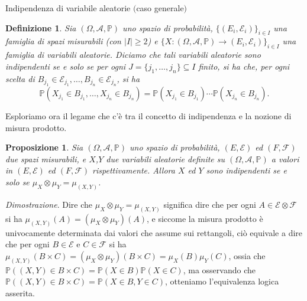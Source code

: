 \documentclass[11pt]{book}
\makeatletter
\theoremstyle{Definizione}
\newtheorem*{mydef}{Definizione}
\theoremstyle{TeoremaProposizioneLemmaCorollario}
\newtheorem{mypropo}[myteo]{Proposizione}
\theoremstyle{OsservazioneNota}
\renewenvironment{proof}[1][\proofname]{\par
  \normalfont \topsep6\p@\@plus6\p@\relax
  \trivlist
  \item[\hskip\labelsep
        \itshape
    #1\@addpunct{.}]\ignorespaces
}{%
  \endtrivlist\@endpefalse
}
\renewcommand{\P}{\mathbb{P}}
\renewenvironment{proof}{\textsl{Dimostrazione}.}{}
\makeatother
\begin{document}
\begin{boxdef}{Indipendenza di variabile aleatorie $($caso generale$)$}
\begin{mydef}
Sia $(\Omega,\mathcal{A},\P)$ uno spazio di probabilità, $\{(E_i,\mathcal{E}_i)\}_{i\in I}$ una famiglia di spazi misurabili (con $|I|\geq 2$) e $\{X:(\Omega,\mathcal{A},\P)\longrightarrow (E_i,\mathcal{E}_i)\}_{i\in I}$ una famiglia di variabili aleatorie. Diciamo che tali variabili aleatorie sono indipendenti se e solo se per ogni $J = \{j_1,\dots,j_n\}\subseteq I$ finito, si ha che, per ogni scelta di $B_{j_1}\in \mathcal{E}_{j_1},\dots,B_{j_n}\in \mathcal{E}_{j_n}$, si ha
$$
\P(X_{j_1}\in B_{j_1},\dots,X_{j_n}\in B_{j_n}) = \P(X_{j_1}\in B_{j_1}) \cdots \P(X_{j_n}\in B_{j_n}).
$$
\end{mydef}
\end{boxdef}
\noindent
Esploriamo ora il legame che c'è tra il concetto di indipendenza e la nozione di misura prodotto.
\begin{boxpro}
\begin{mypropo}\label{pro:VariabiliIndipendentiAlloraDistribuzioneCongiuntaMisuraProdotto}
Sia $(\Omega,\mathcal{A},\P)$ uno spazio di probabilità, $(E,\mathcal{E})$ ed $(F,\mathcal{F})$ due spazi misurabili, e $X$,$Y$ due variabili aleatorie definite su $(\Omega,\mathcal{A},\P)$ a valori in $(E,\mathcal{E})$ ed $(F,\mathcal{F})$ rispettivamente. Allora $X$ ed $Y$ sono indipendenti se e solo se $\mu_X \otimes \mu_Y = \mu_{(X,Y)}$.
\end{mypropo}
\tcblower
\begin{proof}
Dire che $\mu_X \otimes \mu_Y = \mu_{(X,Y)}$ significa dire che per ogni $A\in \mathcal{E}\otimes \mathcal{F}$ si ha $\mu_{(X,Y)}(A) = (\mu_X\otimes\mu_Y)(A)$, e siccome la misura prodotto è univocamente determinata dai valori che assume sui rettangoli, ciò equivale a dire che per ogni $B\in \mathcal{E}$ e $C\in \mathcal{F}$ si ha $\mu_{(X,Y)}(B\times C) = (\mu_X\otimes \mu_Y)(B\times C) = \mu_X(B)\mu_Y(C)$, ossia che $\P((X,Y)\in B\times C) = \P(X\in B)\P(X\in C)$, ma osservando che $\P((X,Y)\in B\times C) = \P(X\in B,Y\in C)$, otteniamo l'equivalenza logica asserita.
\end{proof}
\end{boxpro}
\end{document}
